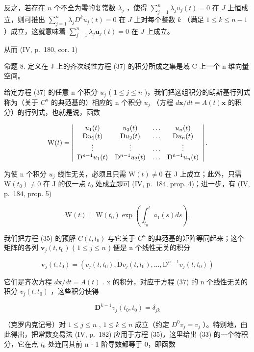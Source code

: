 反之，若存在 \(n\) 个不全为零的复常数 \(\lambda_j\) ，使得 \(\sum_{j=1}^{n} \lambda_j u_j(t) = 0\) 在 \(J\) 上恒成立，则可推出 \(\sum_{j=1}^{n} \lambda_j D^k u_j(t) = 0\) 在 \(J\) 上对每个整数 \(k\) （满足 \(1 \leqslant k \leqslant n - 1\) ）成立，这就意味着 \(\sum_{j=1}^{n} \lambda_j \mathbf{u}_j(t) = 0\) 在 \(J\) 上成立。

从而 (IV, p.~180, cor. 1)

命题 8. 定义在 J 上的齐次线性方程 (37) 的积分所成之集是域 C 上一个 n 维向量空间。

给定方程 (37) 的任意 n 个积分 \(u_{j}\) ( \(1 \leqslant j \leqslant n\) )，我们把这组积分的朗斯基行列式称为（关于 \(C^{n}\) 的典范基的）相应的 n 个积分 \(u_{j}\) （方程 \(d\mathbf{x}/dt = A(t)\mathbf{x}\) 的积分）的行列式，也就是说，函数

\[
\mathrm{W} (t) = \left| \begin{array}{c c c c} u _ {1} (t) & u _ {2} (t) & \ldots & u _ {n} (t) \\ \mathrm{D} u _ {1} (t) & \mathrm{D} u _ {2} (t) & \ldots & \mathrm{D} u _ {n} (t) \\ \vdots & \vdots & \ldots & \vdots \\ \mathrm{D} ^ {n - 1} u _ {1} (t) & \mathrm{D} ^ {n - 1} u _ {2} (t) & \ldots & \mathrm{D} ^ {n - 1} u _ {n} (t) \end{array} \right|.
\]

为使 n 个积分 \(u_{j}\) 线性无关，必须且只需 \(\mathrm{W}(t) \neq 0\) 在 J 上成立；此外，只需 \(\mathrm{W}(t_{0}) \neq 0\) 在 J 的仅一点 \(t_{0}\) 处成立即可 (IV, p.~184, prop. 4)；进一步，有 (IV, p.~184, prop. 5)

\[
\mathrm{W} (t) = \mathrm{W} (t _ {0}) \exp \left(\int_ {t _ {0}} ^ {t} a _ {1} (s) d s\right).\tag{38}
\]

我们把方程 (35) 的预解 \(C(t, t_{0})\) 与它关于 \(C^{n}\) 的典范基的矩阵等同起来；这个矩阵的各列 \(\mathbf{v}_{j}(t, t_{0})\) ( \(1 \leqslant j \leqslant n\) ) 便是 n 个线性无关的积分

\[
\mathbf {v} _ {j} (t, t _ {0}) = (v _ {j} (t, t _ {0}), \mathrm{D} v _ {j} (t, t _ {0}), \dots , \mathrm{D} ^ {n - 1} v _ {j} (t, t _ {0}))
\]

它们是齐次方程 \(d\mathbf{x}/dt = A(t)\) . x 的积分，对应于方程 (37) 的 n 个线性无关的积分 \(v_{j}(t, t_{0})\) ，这些积分使得

\[
\mathbf {D} ^ {k - 1} v _ {j} (t _ {0}, t _ {0}) = \delta_ {j k}
\]

（克罗内克记号）对 \(1 \leqslant j \leqslant n\) , \(1 \leqslant k \leqslant n\) 成立（约定 \(D^{0}v_{j} = v_{j}\) ）。特别地，由此得出，把常数变易法 (IV, p.~182) 应用于方程 (35)，这里给出 (33) 的一个特积分，它在点 \(t_{0}\) 处连同其前 n - 1 阶导数都等于 0，即函数

